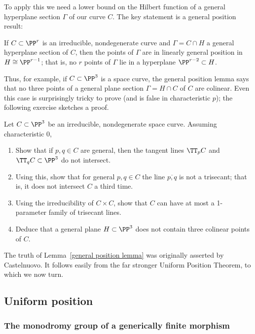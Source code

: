 To apply this we need a lower bound on the Hilbert function of a general hyperplane section $\Gamma$ of our curve $C$. The key statement is a general position result:

\begin{lemma}\label{general position lemma}
If $C \subset \PP^r$ is an irreducible, nondegenerate curve and $\Gamma = C \cap H$ a general hyperplane section of $C$, then the points of $\Gamma$ are in linearly general position in $H \cong \PP^{r-1}$; that is, no $r$ points of $\Gamma$ lie in a hyperplane $\PP^{r-2} \subset H$.
\end{lemma}

Thus, for example, if $C \subset \PP^3$ is a space curve, the general position lemma says that no three points of a general plane section $\Gamma = H \cap C$ of $C$ are colinear. Even this case is surprisingly tricky to prove (and is false in characteristic $p$); the following exercise sketches a proof.

\begin{exercise}
Let $C \subset \PP^3$ be an irreducible, nondegenerate space curve. Assuming characteristic 0,
\begin{enumerate}
\item Show that if $p, q \in C$ are general, then the tangent lines $\TT_pC$ and $\TT_qC \subset \PP^3$ do not intersect.
\item Using this, show that for general $p, q \in C$ the line $\overline{p,q}$ is not a trisecant; that is, it does not intersect $C$ a third time.
\item Using the irreducibility of $C \times C$, show that $C$ can have at most a 1-parameter family of trisecant lines.
\item Deduce that a general plane $H \subset \PP^3$ does not contain three colinear points of $C$.
\end{enumerate}
\end{exercise}

The truth of Lemma~\ref{general position lemma} was originally asserted by Castelnuovo. It follows easily from the far stronger Uniform Position Theorem, to which we now turn. 

\subsection{Uniform position} 

\subsubsection{The monodromy group of a generically finite morphism}

